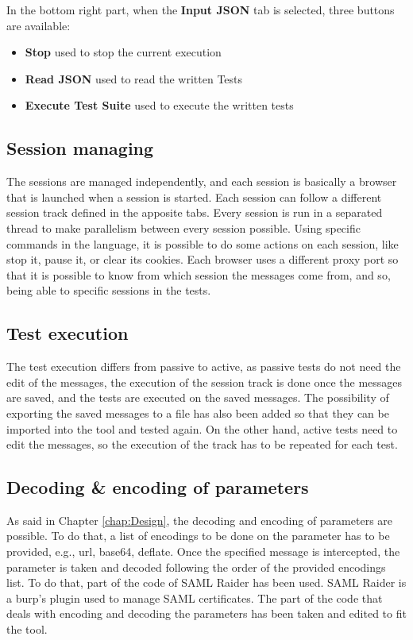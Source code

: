 In the bottom right part, when the \textbf{Input JSON} tab is selected, three buttons are available:
\begin{itemize}
    \item \textbf{Stop} used to stop the current execution
    \item \textbf{Read JSON} used to read the written Tests
    \item \textbf{Execute Test Suite} used to execute the written tests
\end{itemize}

\subsection{Session managing}
The sessions are managed independently, and each session is basically a browser that is launched when a session is started. Each session can follow a different \gls{session track} defined in the apposite tabs. Every session is run in a separated thread to make parallelism between every session possible. Using specific commands in the language, it is possible to do some actions on each session, like stop it, pause it, or clear its cookies. Each browser uses a different proxy port so that it is possible to know from which session the messages come from, and so, being able to specific sessions in the tests.

\subsection{Test execution}
The test execution differs from passive to active, as passive tests do not need the edit of the messages, the execution of the \gls{session track} is done once the messages are saved, and the tests are executed on the saved messages. The possibility of exporting the saved messages to a file has also been added so that they can be imported into the tool and tested again.
On the other hand, active tests need to edit the messages, so the execution of the track has to be repeated for each test.

\subsection{Decoding \& encoding of parameters}
As said in Chapter \ref{chap:Design}, the decoding and encoding of parameters are possible. To do that, a list of encodings to be done on the parameter has to be provided, e.g., url, base64, deflate. Once the specified message is intercepted, the parameter is taken and decoded following the order of the provided encodings list. To do that, part of the code of SAML Raider \cite{saml_raider} has been used. SAML Raider is a \Gls{burp}'s plugin used to manage \Gls{SAML} certificates. The part of the code that deals with encoding and decoding the parameters has been taken and edited to fit the tool.

